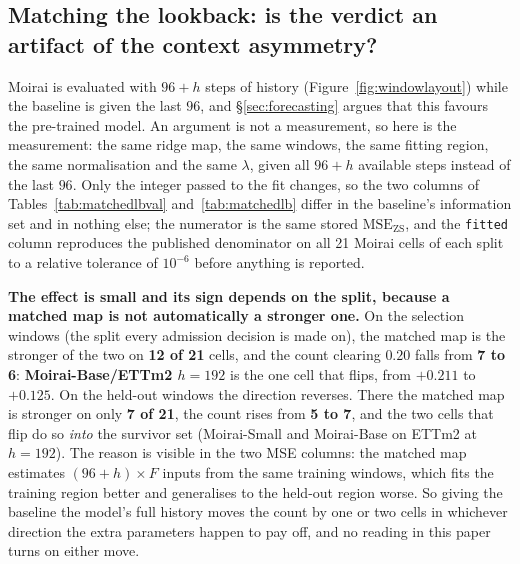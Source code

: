 \subsection{Matching the lookback: is the verdict an artifact of the context asymmetry?}
\label{app:baselines:matchedlb}

Moirai is evaluated with $96{+}h$ steps of history (Figure~\ref{fig:windowlayout})
while the baseline is given the last $96$, and \S\ref{sec:forecasting} argues that
this favours the pre-trained model.  An argument is not a measurement, so here is
the measurement: the same ridge map, the same windows, the same fitting region,
the same normalisation and the same $\lambda$, given all $96{+}h$ available steps
instead of the last $96$.  Only the integer passed to the fit changes, so the two
columns of Tables~\ref{tab:matchedlbval} and~\ref{tab:matchedlb} differ in the
baseline's information set and in nothing else; the numerator is the same stored
$\text{MSE}_\text{ZS}$, and the \texttt{fitted} column reproduces the published
denominator on all 21 Moirai cells of each split to a relative tolerance of
$10^{-6}$ before anything is reported.

\textbf{The effect is small and its sign depends on the split, because a matched
map is not automatically a stronger one.}  On the selection windows (the split
every admission decision is made on), the matched map is the stronger of the two
on \textbf{12 of 21} cells, and the count clearing $0.20$ falls from
\textbf{7 to 6}: \textbf{Moirai-Base/ETTm2 $h{=}192$} is the one cell that flips,
from $+0.211$ to $+0.125$.  On the held-out windows the direction reverses.  There
the matched map is stronger on only \textbf{7 of 21}, the count rises from
\textbf{5 to 7}, and the two cells that flip do so \emph{into} the survivor set
(Moirai-Small and Moirai-Base on ETTm2 at $h{=}192$).  The reason is visible in
the two MSE columns: the matched map estimates $(96{+}h){\times}F$ inputs from the
same training windows, which fits the training region better and generalises to
the held-out region worse.  So giving the baseline the model's full history moves
the count by one or two cells in whichever direction the extra parameters happen
to pay off, and no reading in this paper turns on either move.

